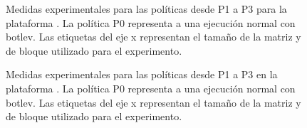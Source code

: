 \begin{figure}
  \centering
  
  \caption[Medidas experimentales para las políticas desde P1 a P3 en \juno]{Medidas
    experimentales para las políticas desde P1 a P3 para la plataforma \juno. La política P0
    representa a una ejecución normal con botlev. Las etiquetas del eje x
    representan el tamaño de la matriz y de bloque utilizado para el experimento.}
  \label{fig:resultados:all-0-3:juno}
\end{figure}

\begin{figure}
  \centering
  \caption[Medidas experimentales para las políticas desde P1 a P3 en \odroid]{Medidas
    experimentales para las políticas desde P1 a P3 en la plataforma \odroid. La política P0
    representa a una ejecución normal con botlev. Las etiquetas del eje x
    representan el tamaño de la matriz y de bloque utilizado para el experimento.}
  \label{fig:resultados:all-0-3:odroid}
\end{figure}

